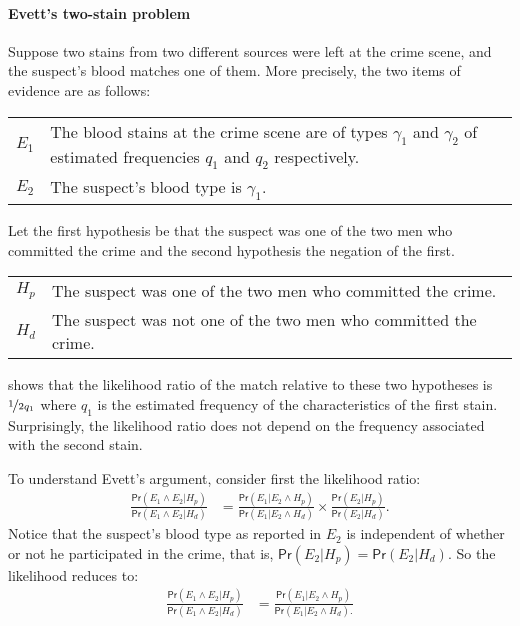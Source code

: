 \documentclass{article}
\newcommand{\pr}{\mathsf{Pr}}
\begin{document}
\paragraph{Evett's two-stain problem}

Suppose two stains from two different sources were left at the crime scene, and the suspect's blood matches one of them. More precisely, the two items of evidence are as follows:
%
\begin{center}
 	\begin{tabular}{lp{12cm}} 
 		$E_1$ & The blood stains at the crime scene are of types $\gamma_1$ and $\gamma_2$ of estimated  frequencies $q_1$ and $q_2$ respectively.\\
 		$E_2$ & The suspect's blood type is $\gamma_1$. 
 	\end{tabular}
 \end{center}
%
Let the first hypothesis be that the suspect was one of the two men who committed the crime and the second hypothesis the negation of the first. 
 \begin{center}
 	\begin{tabular}{lp{12cm}} 
 		$H_p$ & The suspect was one of the two men who committed the crime.\\
 		$H_d$ & The suspect was not one of the two men who committed the crime.
 	\end{tabular}
 \end{center}
%
\cite{Evett1987} shows that the likelihood ratio of the match relative to these two hypotheses is $\nicefrac{1}{2q_1}$ where $q_1$ is the estimated frequency  of the characteristics of the first stain. Surprisingly, the likelihood ratio does not depend on the frequency associated with the second stain. 

To understand Evett's argument, consider first the  likelihood ratio:
%
 \begin{align*}
\frac{\pr(E_1\wedge E_2\vert H_p)}{
	\pr(E_1\wedge E_2\vert H_d)} & = \frac{\pr(E_1 \vert E_2 \wedge H_p)}{
	\pr(E_1 \vert E_2 \wedge H_d)
	}\times 
 \frac{\pr(E_2\vert H_p)}{\pr(E_2 \vert H_d)}. 
 \end{align*}
 \noindent Notice that the suspect's blood type as reported in $E_2$ is independent of whether or not he participated in the crime, that is,
$\pr(E_2\vert H_p)=\pr(E_2 \vert H_d)$. So the likelihood reduces to: 
 \begin{align*}
 \frac{\pr(E_1\wedge E_2\vert H_p)}{
 	\pr(E_1\wedge E_2\vert H_d)} & = \frac{\pr(E_1 \vert E_2 \wedge H_p)}{
 	\pr(E_1 \vert E_2 \wedge H_d).
 } \end{align*} 
 
\end{document}
